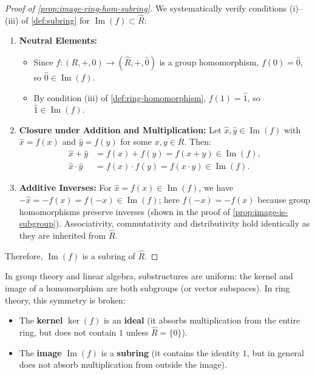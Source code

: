 \begin{content}
\begin{proof}[Proof of \cref{prop:image-ring-hom-subring}]
We systematically verify conditions (i)--(iii) of \cref{def:subring} for $\operatorname{Im}(f) \subset \hat{R}$:
\begin{enumerate}[label=\textbf{(\roman*)}]
    \item \textbf{Neutral Elements:}
    \begin{itemize}
        \item Since $f \colon (R, +, 0) \to (\hat{R}, +, \hat{0})$ is a group homomorphism, $f(0) = \hat{0}$, so $\hat{0} \in \operatorname{Im}(f)$.
        \item By condition (iii) of \cref{def:ring-homomorphism}, $f(1) = \hat{1}$, so $\hat{1} \in \operatorname{Im}(f)$.
    \end{itemize}
    \item \textbf{Closure under Addition and Multiplication:} Let $\hat{x}, \hat{y} \in \operatorname{Im}(f)$ with $\hat{x} = f(x)$ and $\hat{y} = f(y)$ for some $x, y \in R$. Then:
    \begin{align*}
    \hat{x} + \hat{y} &= f(x) + f(y) = f(x + y) \in \operatorname{Im}(f), \\
    \hat{x} \cdot \hat{y} &= f(x) \cdot f(y) = f(x \cdot y) \in \operatorname{Im}(f).
    \end{align*}
    \item \textbf{Additive Inverses:} For $\hat{x} = f(x) \in \operatorname{Im}(f)$, we have $-\hat{x} = -f(x) = f(-x) \in \operatorname{Im}(f)$; here $f(-x) = -f(x)$ because group homomorphisms preserve inverses (shown in the proof of \cref{prop:image-is-subgroup}). Associativity, commutativity and distributivity hold identically as they are inherited from $\hat{R}$.
\end{enumerate}
Therefore, $\operatorname{Im}(f)$ is a subring of $\hat{R}$.
\end{proof}
\end{content}

\begin{insight}
In group theory and linear algebra, substructures are uniform: the kernel and image of a homomorphism are both subgroups (or vector subspaces). In ring theory, this symmetry is broken:
\begin{itemize}
    \item The \textbf{kernel} $\operatorname{ker}(f)$ is an \textbf{ideal} (it absorbs multiplication from the entire ring, but does not contain $1$ unless $\hat{R} = \{0\}$).
    \item The \textbf{image} $\operatorname{Im}(f)$ is a \textbf{subring} (it contains the identity $1$, but in general does not absorb multiplication from outside the image).
\end{itemize}
\end{insight}


